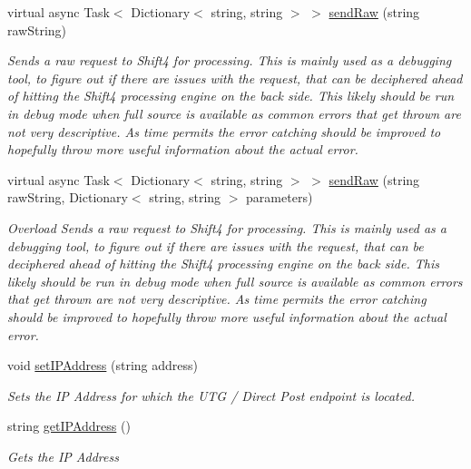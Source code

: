 \begin{DoxyCompactItemize}
virtual async Task$<$ Dictionary$<$ string, string $>$ $>$ \mbox{\hyperlink{class_form_sim_1_1_generic_handler_a806d781f9ad046f8f1574b137ffe86e0}{send\+Raw}} (string raw\+String)
\begin{DoxyCompactList}\small\item\em Sends a raw request to Shift4 for processing. This is mainly used as a debugging tool, to figure out if there are issues with the request, that can be deciphered ahead of hitting the Shift4 processing engine on the back side. This likely should be run in debug mode when full source is available as common errors that get thrown are not very descriptive. As time permits the error catching should be improved to hopefully throw more useful information about the actual error. \end{DoxyCompactList}\item 
virtual async Task$<$ Dictionary$<$ string, string $>$ $>$ \mbox{\hyperlink{class_form_sim_1_1_generic_handler_a9e6731b583644ba3bd5bde94ef86c678}{send\+Raw}} (string raw\+String, Dictionary$<$ string, string $>$ parameters)
\begin{DoxyCompactList}\small\item\em Overload Sends a raw request to Shift4 for processing. This is mainly used as a debugging tool, to figure out if there are issues with the request, that can be deciphered ahead of hitting the Shift4 processing engine on the back side. This likely should be run in debug mode when full source is available as common errors that get thrown are not very descriptive. As time permits the error catching should be improved to hopefully throw more useful information about the actual error. \end{DoxyCompactList}\item 
void \mbox{\hyperlink{class_form_sim_1_1_generic_handler_a7fa7f097410ae531b30fc6f257bcb393}{set\+I\+P\+Address}} (string address)
\begin{DoxyCompactList}\small\item\em Sets the IP Address for which the U\+TG / Direct Post endpoint is located. \end{DoxyCompactList}\item 
string \mbox{\hyperlink{class_form_sim_1_1_generic_handler_ab567abdefd58e1fcb3006861c741961c}{get\+I\+P\+Address}} ()
\begin{DoxyCompactList}\small\item\em Gets the IP Address \end{DoxyCompactList}\item 

\end{DoxyCompactItemize}
